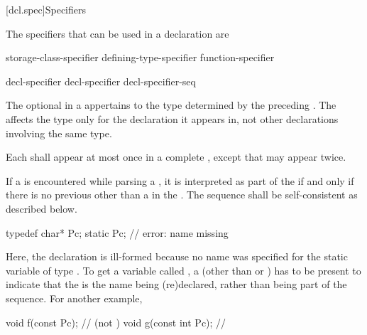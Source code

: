 [dcl.spec]{Specifiers}%

\pnum
{}%
The specifiers that can be used in a declaration are

\begin{bnf}
\br
    storage-class-specifier\br
    defining-type-specifier\br
    function-specifier\br
    \br
    \br
    \br
\end{bnf}

\begin{bnf}
\br
    decl-specifier \br
    decl-specifier decl-specifier-seq
\end{bnf}

The optional  in a 
appertains to the type determined by the preceding
. The 
affects the type only for the declaration it appears in, not other declarations involving the
same type.

\pnum
Each  shall appear at most once in a complete
, except that
 may appear twice.

\pnum
{}%
If a  is encountered while parsing a ,
it is interpreted as part of the  if and only if there is no
previous  other than a  in the
.
The sequence shall be self-consistent as
described below.
\begin{example}
\begin{codeblock}
typedef char* Pc;
static Pc;                      // error: name missing
\end{codeblock}
Here, the declaration   is ill-formed because no
name was specified for the static variable of type . To get a
variable called , a  (other than
 or ) has to be present to indicate that
the   is the name being (re)declared,
rather than being part of the  sequence. For
another example,
\begin{codeblock}
void f(const Pc);               //  (not )
void g(const int Pc);           // 
\end{codeblock}
\end{example}

